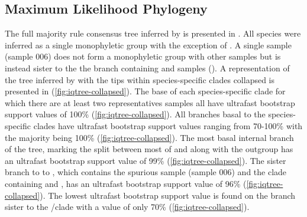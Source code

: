 \subsection{Maximum Likelihood Phylogeny}
The full majority rule consensus tree inferred by \iqtree is presented in \iqtreefigs. 
All species were inferred as a single monophyletic group with the exception 
of \fowl. 
A single \fowl sample (sample 006) does not form a monophyletic group with other 
\fowl samples but is instead sister to the the branch containing \wood and \fowl samples (\iqtreefigs).
A representation of the tree inferred by \iqtree with the tips within
species-specific clades collapsed is presented in (\cref{fig:iqtree-collapsed}). 
The base of each species-specific clade for which there are at least two representatives
samples all have ultrafast bootstrap support values of 100\% (\cref{fig:iqtree-collapsed}).
All branches basal to the species-specific clades have ultrafast 
bootstrap support values ranging from 70-100\% with the majority being 100\% (\cref{fig:iqtree-collapsed}).
The most basal internal branch of the tree, marking the split between most of \anaxyrus
and \punctatus along with the outgroup \nebulifer has an ultrafast bootstrap 
support value of 99\% (\cref{fig:iqtree-collapsed}).
The sister branch to to \terr, which contains the spurious \fowl sample (sample 006)
and the clade containing \fowl and \wood, has an ultrafast bootstrap support 
value of 96\% (\cref{fig:iqtree-collapsed}).
The lowest ultrafast bootstrap support value is found on the branch sister 
to the \cognatus/\speciosus clade with a value of only 70\% (\cref{fig:iqtree-collapsed}).

